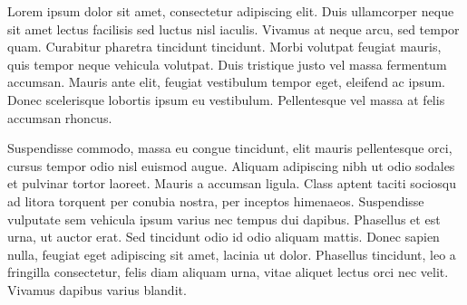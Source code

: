 \documentclass[11pt, letterpaper]{awesome-cv}
\begin{document}
\makecvheader[R]

\makecvfooter
  {}
  {}
  {}

\makelettertitle


\begin{cvletter}



Lorem ipsum dolor sit amet, consectetur adipiscing elit. Duis ullamcorper neque sit amet lectus facilisis sed luctus nisl iaculis. Vivamus at neque arcu, sed tempor quam. Curabitur pharetra tincidunt tincidunt. Morbi volutpat feugiat mauris, quis tempor neque vehicula volutpat. Duis tristique justo vel massa fermentum accumsan. Mauris ante elit, feugiat vestibulum tempor eget, eleifend ac ipsum. Donec scelerisque lobortis ipsum eu vestibulum. Pellentesque vel massa at felis accumsan rhoncus.



Suspendisse commodo, massa eu congue tincidunt, elit mauris pellentesque orci, cursus tempor odio nisl euismod augue. Aliquam adipiscing nibh ut odio sodales et pulvinar tortor laoreet. Mauris a accumsan ligula. Class aptent taciti sociosqu ad litora torquent per conubia nostra, per inceptos himenaeos. Suspendisse vulputate sem vehicula ipsum varius nec tempus dui dapibus. Phasellus et est urna, ut auctor erat. Sed tincidunt odio id odio aliquam mattis. Donec sapien nulla, feugiat eget adipiscing sit amet, lacinia ut dolor. Phasellus tincidunt, leo a fringilla consectetur, felis diam aliquam urna, vitae aliquet lectus orci nec velit. Vivamus dapibus varius blandit.

\end{cvletter}


\makeletterclosing
\end{document}
